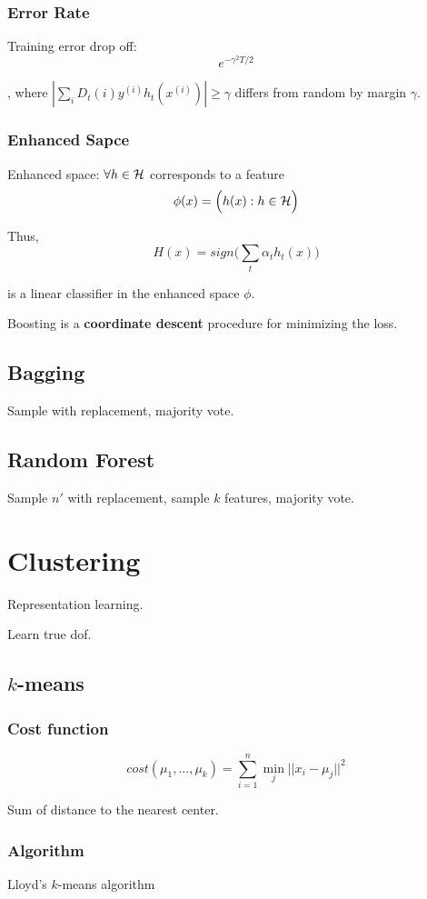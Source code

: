 \documentclass[a4paper]{report}
\begin{document}
\subsection{Error Rate}
Training error drop off:
$$
e^{-\gamma^2T/2}
$$

, where $|\sum_i D_t(i)y^{(i)}h_t(x^{(i)})|\geq \gamma$ differs from random by margin $\gamma$.

\subsection{Enhanced Sapce}
Enhanced space: $\forall h \in \mathcal{H}$ corresponds to a feature 
$$
\phi(x) = \Big(h(x):h\in \mathcal{H}\Big)
$$

Thus, 
$$
H(x) = sign\Big(\sum_t \alpha_t h_t(x)\Big)
$$

is a linear classifier in the enhanced space $\phi$. 

Boosting is a \textbf{coordinate descent} procedure for minimizing the loss.

\section{Bagging}
Sample with replacement, majority vote.

\section{Random Forest}
Sample $n'$ with replacement, sample $k$ features, majority vote.

\chapter{Clustering}
Representation learning. 

Learn true dof. 

\section{$k$-means}
\subsection{Cost function}
$$
cost(\mu_1, ..., \mu_k) = \sum_{i=1}^n \min_j ||x_i-\mu_j||^2
$$

Sum of distance to the nearest center. 

\subsection{Algorithm}
Lloyd’s $k$-means algorithm
\end{document}
